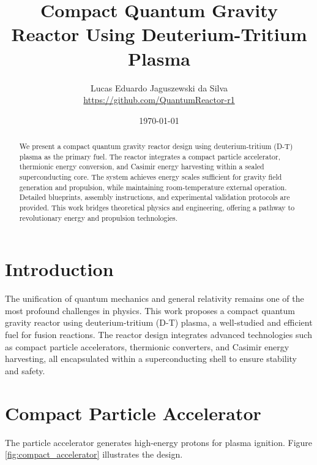 \documentclass[12pt, a4paper]{article}
\title{Compact Quantum Gravity Reactor Using Deuterium-Tritium Plasma}
\author{Lucas Eduardo Jaguszewski da Silva \\ \url{https://github.com/QuantumReactor-r1}}
\date{\today}
\begin{document}
\maketitle

\begin{abstract}
We present a compact quantum gravity reactor design using deuterium-tritium (D-T) plasma as the primary fuel. The reactor integrates a compact particle accelerator, thermionic energy conversion, and Casimir energy harvesting within a sealed superconducting core. The system achieves energy scales sufficient for gravity field generation and propulsion, while maintaining room-temperature external operation. Detailed blueprints, assembly instructions, and experimental validation protocols are provided. This work bridges theoretical physics and engineering, offering a pathway to revolutionary energy and propulsion technologies.
\end{abstract}

\section{Introduction}
The unification of quantum mechanics and general relativity remains one of the most profound challenges in physics. This work proposes a compact quantum gravity reactor using deuterium-tritium (D-T) plasma, a well-studied and efficient fuel for fusion reactions. The reactor design integrates advanced technologies such as compact particle accelerators, thermionic converters, and Casimir energy harvesting, all encapsulated within a superconducting shell to ensure stability and safety.

\section{Compact Particle Accelerator}
The particle accelerator generates high-energy protons for plasma ignition. Figure \ref{fig:compact_accelerator} illustrates the design.
\end{document}
